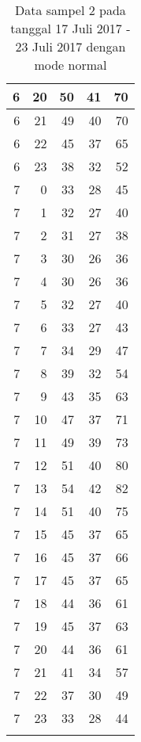 \begin{longtable}{|r|r|r|r|r|}
    \hline
    6     & 20    & 50    & 41    & 70 \\
    \hline
    6     & 21    & 49    & 40    & 70 \\
    \hline
    6     & 22    & 45    & 37    & 65 \\
    \hline
    6     & 23    & 38    & 32    & 52 \\
    \hline
    7     & 0     & 33    & 28    & 45 \\
    \hline
    7     & 1     & 32    & 27    & 40 \\
    \hline
    7     & 2     & 31    & 27    & 38 \\
    \hline
    7     & 3     & 30    & 26    & 36 \\
    \hline
    7     & 4     & 30    & 26    & 36 \\
    \hline
    7     & 5     & 32    & 27    & 40 \\
    \hline
    7     & 6     & 33    & 27    & 43 \\
    \hline
    7     & 7     & 34    & 29    & 47 \\
    \hline
    7     & 8     & 39    & 32    & 54 \\
    \hline
    7     & 9     & 43    & 35    & 63 \\
    \hline
    7     & 10    & 47    & 37    & 71 \\
    \hline
    7     & 11    & 49    & 39    & 73 \\
    \hline
    7     & 12    & 51    & 40    & 80 \\
    \hline
    7     & 13    & 54    & 42    & 82 \\
    \hline
    7     & 14    & 51    & 40    & 75 \\
    \hline
    7     & 15    & 45    & 37    & 65 \\
    \hline
    7     & 16    & 45    & 37    & 66 \\
    \hline
    7     & 17    & 45    & 37    & 65 \\
    \hline
    7     & 18    & 44    & 36    & 61 \\
    \hline
    7     & 19    & 45    & 37    & 63 \\
    \hline
    7     & 20    & 44    & 36    & 61 \\
    \hline
    7     & 21    & 41    & 34    & 57 \\
    \hline
    7     & 22    & 37    & 30    & 49 \\
    \hline
    7     & 23    & 33    & 28    & 44 \\
    \hline
  \caption{Data sampel 2 pada tanggal 17 Juli 2017 - 23 Juli 2017 dengan mode normal}
  \label{tab:datasample217072017normal}%
\end{longtable}%

